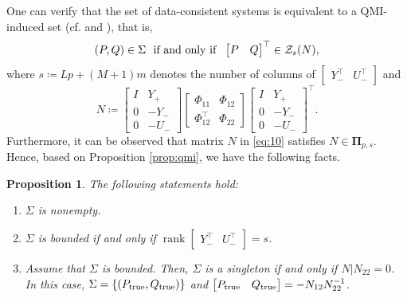 \documentclass[pdflatex,sn-mathphys-num]{sn-jnl}%
\DeclareMathOperator{\rank}{rank}
\theoremstyle{thmstyleone}
\newtheorem{proposition}[theorem]{Proposition}
\begin{document}
One can verify that the set of data-consistent systems is equivalent to a QMI-induced set (cf. \cite[Lem. 4]{van2020noisy} and \cite[Sec. IV]{van2023behavioral}), that is,
\begin{equation}
\label{eq:Sigma->QMI}
(P,Q)\in\Sigma\ \textup{ if and only if }\ \begin{bmatrix}
P & Q
\end{bmatrix}^\top\in\mathcal{Z}_{s}(N),
\end{equation}
where $s\coloneqq Lp+(M+1)m$ denotes the number of columns of $\begin{bmatrix}
    Y_-^\top & U_-^\top
    \end{bmatrix}$ and 
\begin{equation}
\label{eq:10}
N\coloneqq 
\begin{bmatrix}
I & Y_+ \\ 
0 & -Y_- \\
0 & -U_-
\end{bmatrix}\begin{bmatrix}
\Phi_{11} & \Phi_{12} \\
\Phi_{12}^\top & \Phi_{22}
\end{bmatrix}\begin{bmatrix}
I & Y_+ \\ 
0 & -Y_- \\
0 & -U_-
\end{bmatrix}^\top .
\end{equation}
Furthermore, it can be observed that matrix $N$ in \eqref{eq:10} satisfies $N\in\pmb{\Pi}_{p,s}$. Hence, based on Proposition \ref{prop:qmi}, we have the following facts.

\begin{proposition}
\label{prop:xu}
The following statements hold: 
\begin{enumerate}[label=\normalfont{(\alph*)},ref=\ref{prop:xu}(\alph*)]
    \item\label{prop:xu-a} $\Sigma$ is nonempty.
    \item\label{prop:xu-b} $\Sigma$ is bounded if and only if $\rank\begin{bmatrix}
    Y_-^\top & U_-^\top
    \end{bmatrix}=s$.
    \item\label{prop:xu-c} Assume that $\Sigma$ is bounded. Then, $\Sigma$ is a singleton if and only if $N|N_{22}=0$. In this case, $\Sigma=\{(P_{\textup{true}},Q_{\textup{true}})\}$ and $\begin{bmatrix} P_{\textup{true}} & Q_{\textup{true}} \end{bmatrix}=-N_{12}N_{22}^{-1}$.
\end{enumerate}
\end{proposition}
\end{document}
